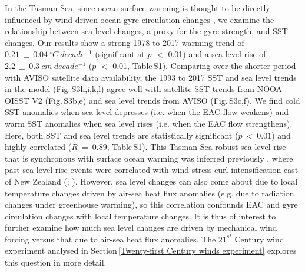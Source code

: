 \documentclass[draft,linenumbers]{agujournal2018}
\begin{document}
In the Tasman Sea, since ocean surface warming is thought to be directly influenced by wind-driven ocean gyre circulation changes \citep{Hill2011,Oliver2014,Ridgway2007b,Roemmich2007,Wu2012}, we examine the relationship between sea level changes, a proxy for the gyre strength, and SST changes. Our results show a strong 1978 to 2017 warming trend of $0.21\ \pm\ 0.04\ ^{\circ}C\ decade^{-1}$ (significant at $p$ $<$ 0.01) and a sea level rise of $2.2\ \pm\ 0.3\ cm\ decade^{-1}$ ($p$ $<$ 0.01, Table\,S1). Comparing over the shorter period with AVISO satellite data availability, the 1993 to 2017 SST and sea level trends in the model (Fig.\,S3h,i,k,l) agree well with satellite SST trends from NOOA OISST V2 (Fig.\,S3b,e) and sea level trends from AVISO (Fig.\,S3c,f). We find cold SST anomalies when sea level depresses (i.e. when the EAC flow weakens) and warm SST anomalies when sea level rises (i.e. when the EAC flow strengthens). Here, both SST and sea level trends are statistically significant ($p\ <\ 0.01$) and highly correlated ($R\ =\ 0.89$, Table\,S1). This Tasman Sea robust sea level rise that is synchronous with surface ocean warming was inferred previously \citep{Holbrook1997}, where past sea level rise events were correlated with wind stress curl intensification east of New Zealand (\citealp{Roemmich2007}; \citealp{Roemmich2016}). However, sea level changes can also come about due to local temperature changes driven by air-sea heat flux anomalies (e.g. due to radiation changes under greenhouse warming), so this correlation confounds EAC and gyre circulation changes with local temperature changes. It is thus of interest to further examine how much sea level changes are driven by mechanical wind forcing versus that due to air-sea heat flux anomalies. The $21^{st}$ Century wind experiment analysed in Section\,\ref{Twenty-first Century winds experiment} explores this question in more detail.
\end{document}
